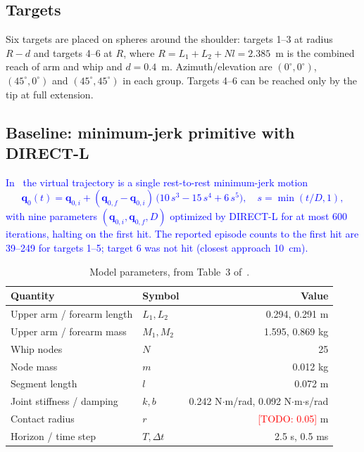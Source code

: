 \documentclass[letterpaper, 10 pt, conference]{ieeeconf}
\newcommand{\todo}[1]{\textcolor{red}{[TODO: #1]}}
\newcommand{\draft}[1]{\textcolor{blue}{#1}}
\newcommand{\vq}{\mathbf{q}}
\begin{document}
\subsection{Targets}
Six targets are placed on spheres around the shoulder: targets 1--3 at radius
$R - d$ and targets 4--6 at $R$, where $R = L_1 + L_2 + N l = 2.385$~m is the
combined reach of arm and whip and $d=0.4$~m. Azimuth/elevation are
$(0^\circ,0^\circ)$, $(45^\circ,0^\circ)$ and $(45^\circ,45^\circ)$ in each
group. Targets 4--6 can be reached only by the tip at full extension.

\subsection{Baseline: minimum-jerk primitive with DIRECT-L}
\draft{
In~\cite{nah2023whip} the virtual trajectory is a single rest-to-rest
minimum-jerk motion
\begin{equation}
  \vq_0(t) = \vq_{0,i} + (\vq_{0,f} - \vq_{0,i})\,
  \big(10\,s^3 - 15\,s^4 + 6\,s^5\big),\quad s = \min(t/D, 1),
  \label{eq:minjerk}
\end{equation}
with nine parameters $(\vq_{0,i}, \vq_{0,f}, D)$ optimized by DIRECT-L
\cite{gablonsky2001direct} for at most 600 iterations, halting on the first
hit. The reported episode counts to the first hit are 39--249 for targets 1--5;
target 6 was not hit (closest approach 10~cm).
}

\begin{table}[t]
\caption{Model parameters, from Table~3 of~\cite{nah2023whip}.}
\label{tab:params}
\centering
\begin{tabular}{llr}
\toprule
Quantity & Symbol & Value \\
\midrule
Upper arm / forearm length & $L_1, L_2$ & 0.294, 0.291 m \\
Upper arm / forearm mass & $M_1, M_2$ & 1.595, 0.869 kg \\
Whip nodes & $N$ & 25 \\
Node mass & $m$ & 0.012 kg \\
Segment length & $l$ & 0.072 m \\
Joint stiffness / damping & $k, b$ & 0.242 N$\cdot$m/rad, 0.092 N$\cdot$m$\cdot$s/rad \\
Contact radius & $r$ & \todo{0.05} m \\
Horizon / time step & $T, \Delta t$ & 2.5 s, 0.5 ms \\
\bottomrule
\end{tabular}
\end{table}
\end{document}
